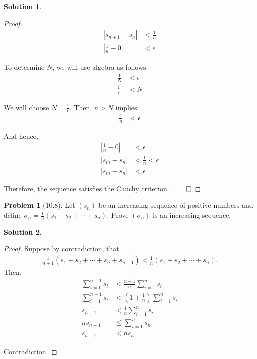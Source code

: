 \documentclass[12pt]{article}
\theoremstyle{definition} %
\newtheorem{solution}{Solution}
\newtheorem{problem}{Problem}
\theoremstyle{plain} %
\begin{document}
\begin{solution}
\begin{enumerate}
\begin{proof}
            \begin{align}
                |s_{n+1} - s_n| &< \frac{1}{n} \tag{40} \\
                \left| \frac{1}{n} - 0 \right| &< \epsilon \tag{41}
            \end{align}
        
            To determine $N$, we will use algebra as follows:
            \begin{align}
                \frac{1}{N} &< \epsilon \tag{42} \\
                \frac{1}{\epsilon} &< N \tag{43}
            \end{align}
        
            We will choose $N = \frac{1}{\epsilon}$. Then, $n > N$ implies:
            \begin{align}
                \frac{1}{n} &< \epsilon \tag{44}
            \end{align}
        
            And hence,
            \begin{align}
                \left| \frac{1}{n} - 0 \right| &< \epsilon \tag{45} \\
                |s_m - s_n| &< \frac{1}{n} < \epsilon \tag{46} \\
                |s_m - s_n| &< \epsilon \tag{47}
            \end{align}
        
            Therefore, the sequence satisfies the Cauchy criterion. $\qed$
        \end{proof}
    \end{enumerate}
\end{solution}

\begin{problem}[10.8]
    Let $(s_n)$ be an increasing sequence of positive numbers and define $\sigma_n = \frac{1}{n} (s_1 + s_2 + \cdots + s_n)$. Prove $(\sigma_n)$ is an increasing sequence.
\end{problem}

\begin{solution}
    \begin{proof}
        Suppose by contradiction, that 
        \begin{align}
        \frac{1}{n+1}(s_1 + s_2 + \cdots + s_n + s_{n+1}) < \frac{1}{n}(s_1 + s_2 + \cdots + s_n).
        \end{align}
        Then,
        \begin{align}
            \sum_{i=1}^{n+1} s_i &< \frac{n+1}{n} \sum_{i=1}^n s_i \tag{48} \\
            \sum_{i=1}^{n+1} s_i &< \left( 1 + \frac{1}{n} \right) \sum_{i=1}^n s_i \tag{49} \\
            s_{n+1} &< \frac{1}{n} \sum_{i=1}^n s_i \tag{50} \\
            ns_{n+1} &\leq \sum_{i=1}^n s_n \tag{51} \\
            s_{n+1} &< ns_n \tag{52}
        \end{align}
    
        Contradiction.
    \end{proof}
\end{solution}
\end{document}

